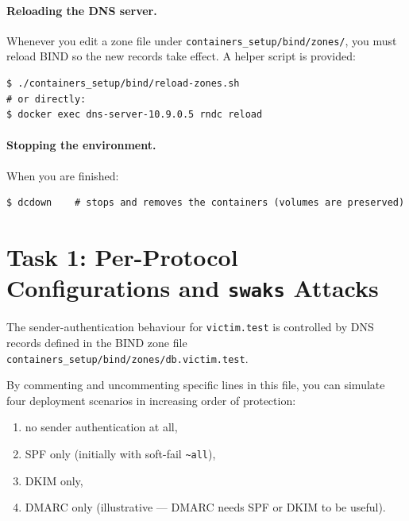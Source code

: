 \documentclass[11pt]{article}
\begin{document}
\paragraph{Reloading the DNS server.}
Whenever you edit a zone file under
\texttt{containers\_setup/bind/zones/}, you must reload BIND so the new
records take effect. A helper script is provided:

\begin{listing}[H]
\begin{verbatim}
$ ./containers_setup/bind/reload-zones.sh
# or directly:
$ docker exec dns-server-10.9.0.5 rndc reload
\end{verbatim}
\end{listing}

\paragraph{Stopping the environment.}
When you are finished:

\begin{listing}[H]
\begin{verbatim}
$ dcdown    # stops and removes the containers (volumes are preserved)
\end{verbatim}
\end{listing}

\section{Task 1: Per-Protocol Configurations and \texttt{swaks} Attacks}

The sender-authentication behaviour for \texttt{victim.test} is
controlled by DNS records defined in the BIND zone file
\texttt{containers\_setup/bind/zones/db.victim.test}.

By commenting and uncommenting specific lines in this file, you can
simulate four deployment scenarios in increasing order of protection:

\begin{enumerate}[noitemsep]
  \item no sender authentication at all,
  \item SPF only (initially with soft-fail \texttt{\textasciitilde all}),
  \item DKIM only,
  \item DMARC only (illustrative --- DMARC needs SPF or DKIM to be useful).
\end{enumerate}
\end{document}
